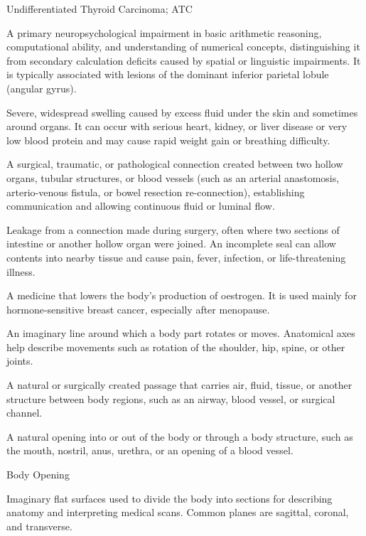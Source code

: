\synonyms
Undifferentiated Thyroid Carcinoma; ATC

 A primary neuropsychological impairment in basic arithmetic reasoning, computational ability, and understanding of numerical concepts, distinguishing it from secondary calculation deficits caused by spatial or linguistic impairments. It is typically associated with lesions of the dominant inferior parietal lobule (angular gyrus).

 Severe, widespread swelling caused by excess fluid under the skin and sometimes around organs. It can occur with serious heart, kidney, or liver disease or very low blood protein and may cause rapid weight gain or breathing difficulty.

 A surgical, traumatic, or pathological connection created between two hollow organs, tubular structures, or blood vessels (such as an arterial anastomosis, arterio-venous fistula, or bowel resection re-connection), establishing communication and allowing continuous fluid or luminal flow.

 Leakage from a connection made during surgery, often where two sections of intestine or another hollow organ were joined. An incomplete seal can allow contents into nearby tissue and cause pain, fever, infection, or life-threatening illness.

 A medicine that lowers the body’s production of oestrogen. It is used mainly for hormone-sensitive breast cancer, especially after menopause.

 An imaginary line around which a body part rotates or moves. Anatomical axes help describe movements such as rotation of the shoulder, hip, spine, or other joints.

 A natural or surgically created passage that carries air, fluid, tissue, or another structure between body regions, such as an airway, blood vessel, or surgical channel.

 A natural opening into or out of the body or through a body structure, such as the mouth, nostril, anus, urethra, or an opening of a blood vessel.

\synonyms
Body Opening

 Imaginary flat surfaces used to divide the body into sections for describing anatomy and interpreting medical scans. Common planes are sagittal, coronal, and transverse.

